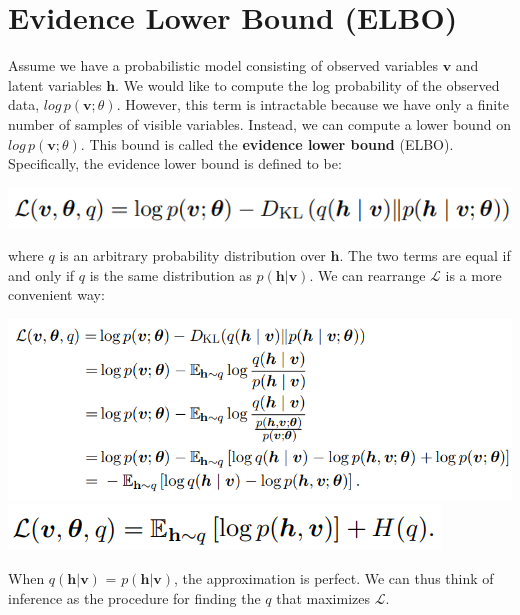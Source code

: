 \section{Evidence Lower Bound (ELBO)}
Assume we have a probabilistic model consisting of observed variables $\textbf{v}$ and latent variables $\textbf{h}$. We would like to compute the log probability of the observed data, $log\, p(\textbf{v};\theta)$. However, this term is intractable because we have only a finite number of samples of visible variables. Instead, we can compute a lower bound on $log\, p(\textbf{v};\theta)$. This bound is called the \textbf{evidence lower bound} (ELBO). Specifically, the evidence lower bound is defined to be:
\begin{center}
    \includegraphics[scale=0.8]{images/ELBO.png}
\end{center}
where $q$ is an arbitrary probability distribution over $\textbf{h}$. The two terms are equal if and only if $q$ is the same distribution as $p(\textbf{h} | \textbf{v})$. We can rearrange $\mathcal{L}$ is a more convenient way:
\begin{center}
    \includegraphics[scale=0.8]{images/ELBO2.png}
    \includegraphics[scale=0.8]{images/ELBO3.png}
\end{center}
When $q(\textbf{h} | \textbf{v})$ = $p(\textbf{h} | \textbf{v})$, the approximation is perfect. We can thus think of inference as the procedure for finding the $q$ that maximizes $\mathcal{L}$.

